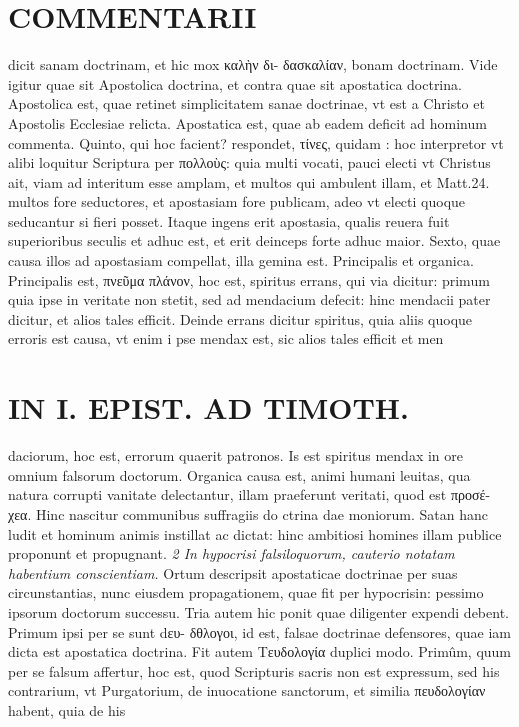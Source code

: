 \documentclass{article}
\begin{document}
\begin{pages}
\section*{COMMENTARII }
\marginpar{[ p.86 ]}\pstart dicit sanam doctrinam, et hic mox καλὴν δι- δασκαλίαν, bonam doctrinam. Vide igitur quae sit Apostolica doctrina, et contra quae sit apostatica doctrina. Apostolica est, quae retinet simplicitatem sanae doctrinae, vt est a Christo et Apostolis Ecclesiae relicta. Apostatica est, quae ab eadem deficit ad hominum commenta.  \pend\pstart Quinto, qui hoc facient? respondet, τίνες, quidam : hoc interpretor vt alibi loquitur Scriptura per πολλοὺς: quia multi vocati, pauci electi vt Christus ait, viam ad interitum esse amplam, et multos qui ambulent illam, et Matt.24. multos fore seductores, et apostasiam fore publicam, adeo vt electi quoque seducantur si fieri posset. Itaque ingens erit apostasia, qualis reuera fuit superioribus seculis et adhuc est, et erit deinceps forte adhuc maior.  \pend\pstart Sexto, quae causa illos ad apostasiam compellat, illa gemina est. Principalis et organica. Principalis est, πνεῦμα πλάνον, hoc est, spiritus errans, qui via dicitur: primum quia ipse in veritate non stetit, sed ad mendacium defecit: hinc mendacii pater dicitur, et alios tales efficit. Deinde errans dicitur spiritus, quia aliis quoque erroris est causa, vt enim i pse mendax est, sic alios tales efficit et men\pend
\section*{IN I. EPIST. AD TIMOTH. }
\marginpar{[ p.87 ]}\pstart daciorum, hoc est, errorum quaerit patronos. Is est spiritus mendax in ore omnium falsorum doctorum.  \pend\pstart Organica causa est, animi humani leuitas, qua natura corrupti vanitate delectantur, illam praeferunt veritati, quod est προσέ- χεα. Hinc nascitur communibus suffragiis do ctrina dae moniorum. Satan hanc ludit et hominum animis instillat ac dictat: hinc ambitiosi homines illam publice proponunt et propugnant.  \pend
\textit{2 In hypocrisi falsiloquorum, cauterio notatam habentium conscientiam. }\pstart Ortum descripsit apostaticae doctrinae per suas circunstantias, nunc eiusdem propagationem, quae fit per hypocrisin: pessimo ipsorum doctorum successu. Tria autem hic ponit quae diligenter expendi debent. Primum ipsi per se sunt dευ- δθλογοι, id est, falsae doctrinae defensores, quae iam dicta est apostatica doctrina. Fit autem Τευδολογία duplici modo. Primûm, quum per se falsum affertur, hoc est, quod Scripturis sacris non est expressum, sed his contrarium, vt Purgatorium, de inuocatione sanctorum, et similia πευδολογίαν habent, quia de his  \pend

\end{pages}
\end{document}
